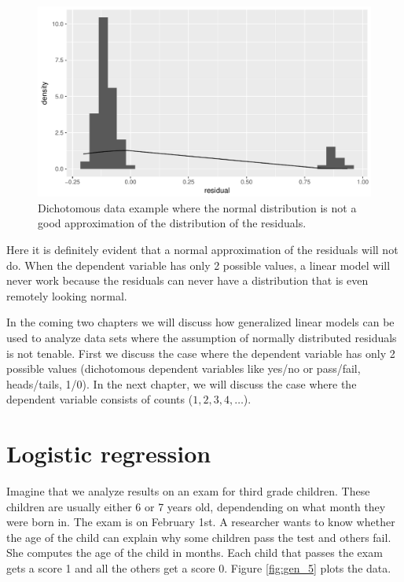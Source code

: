 \documentclass[]{report}\usepackage[]{graphicx}\usepackage[]{color}
\makeatletter
\def\maxwidth{ %
  \ifdim\Gin@nat@width>\linewidth
    \linewidth
  \else
    \Gin@nat@width
  \fi
}
\newenvironment{knitrout}{}{} %
\makeatother
\begin{document}
\begin{knitrout}
\color{fgcolor}\begin{figure}

{\centering \includegraphics[width=\maxwidth]{figure/gen_4-1} 

}

\caption[Dichotomous data example where the normal distribution is not a good approximation of the distribution of the residuals]{Dichotomous data example where the normal distribution is not a good approximation of the distribution of the residuals.}\label{fig:gen_4}
\end{figure}


\end{knitrout}
% 
% 
Here it is definitely evident that a normal approximation of the residuals will not do. When the dependent variable has only 2 possible values, a linear model will never work because the residuals can never have a distribution that is even remotely looking normal.

In the coming two chapters we will discuss how generalized linear models can be used to analyze data sets where the assumption of normally distributed residuals is not tenable. First we discuss the case where the dependent variable has only 2 possible values (dichotomous dependent variables like yes/no or pass/fail, heads/tails, 1/0). In the next chapter, we will discuss the case where the dependent variable consists of counts ($1, 2, 3, 4, \dots$).


\section{Logistic regression}

Imagine that we analyze results on an exam for third grade children. These children are usually either 6 or 7 years old, dependending on what month they were born in. The exam is on February 1st. A researcher wants to know whether the age of the child can explain why some children pass the test and others fail. She computes the age of the child in months. Each child that passes the exam gets a score 1 and all the others get a score 0. Figure \ref{fig:gen_5} plots the data.
\end{document}
